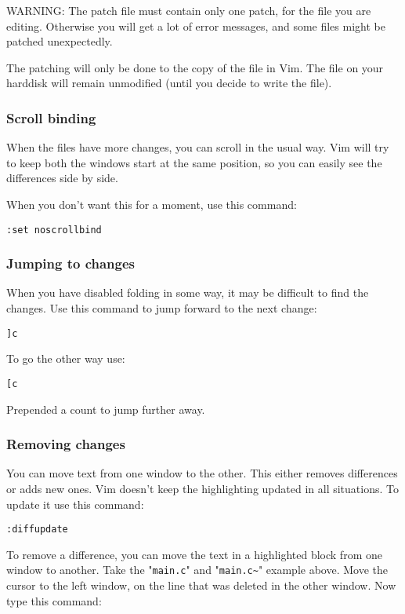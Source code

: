 WARNING: The patch file must contain only one patch, for the file you are editing.
Otherwise you will get a lot of error messages, and some files might be patched unexpectedly.

The patching will only be done to the copy of the file in Vim.
The file on your harddisk will remain unmodified (until you decide to write the file).

\subsubsection{Scroll binding}
When the files have more changes, you can scroll in the usual way.
Vim will try to keep both the windows start at the same position, so you can easily see the differences side by side.

When you don't want this for a moment, use this command:

 \begin{Verbatim}[samepage=true]
 :set noscrollbind
 \end{Verbatim}

\subsubsection{Jumping to changes}
When you have disabled folding in some way, it may be difficult to find the changes.
Use this command to jump forward to the next change:

 \begin{Verbatim}[samepage=true]
 ]c
 \end{Verbatim}

To go the other way use:

 \begin{Verbatim}[samepage=true]
 [c
 \end{Verbatim}

Prepended a count to jump further away.
\subsubsection{Removing changes}
You can move text from one window to the other.
This either removes differences or adds new ones.
Vim doesn't keep the highlighting updated in all situations.
To update it use this command:

 \begin{Verbatim}[samepage=true]
 :diffupdate
 \end{Verbatim}

To remove a difference, you can move the text in a highlighted block from one window to another.
Take the "\verb!main.c!" and "\verb!main.c~!" example above.
Move the cursor to the left window, on the line that was deleted in the other window.
Now type this command:

